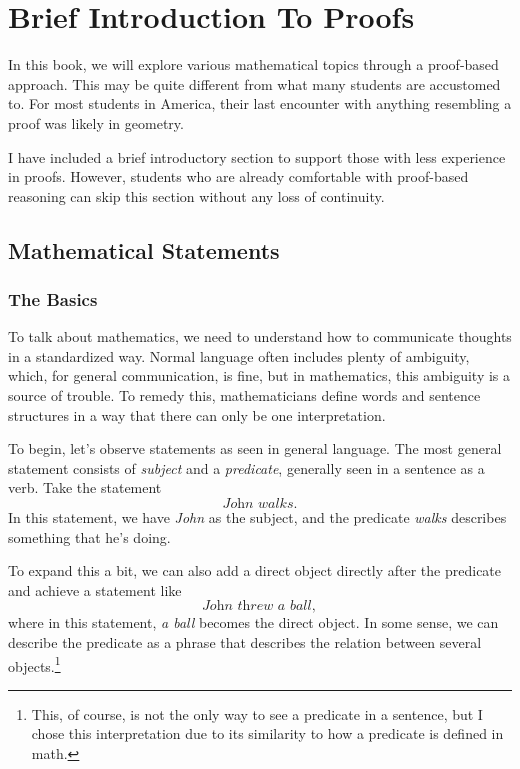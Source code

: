 \setcounter{chapter}{-1}

\edef\mychapter{Brief Introduction To Proofs}
\edef\mychapterdate{March 31, 2025}

\chapter{\mychapter}

In this book, we will explore various mathematical topics through a proof-based approach. This may be quite different from what many students are accustomed to. For most students in America, their last encounter with anything resembling a proof was likely in geometry.

I have included a brief introductory section to support those with less experience in proofs. However, students who are already comfortable with proof-based reasoning can skip this section without any loss of continuity.

\section{Mathematical Statements}
\subsection{The Basics}
To talk about mathematics, we need to understand how to communicate thoughts in a standardized way.
Normal language often includes plenty of ambiguity, which, for general communication, is fine, but in mathematics, this ambiguity is a source of trouble.
To remedy this, mathematicians define words and sentence structures in a way that there can only be one interpretation.

To begin, let's observe statements as seen in general language.
The most general statement consists of \textit{subject} and a \textit{predicate}, generally seen in a sentence as a verb.
Take the statement
$$\textit{John walks}.$$
In this statement, we have \textit{John} as the subject, and the predicate \textit{walks} describes something that he's doing.

To expand this a bit, we can also add a direct object directly after the predicate and achieve a statement like
$$\textit{John threw a ball},$$
where in this statement, \textit{a ball} becomes the direct object.
In some sense, we can describe the predicate as a phrase that describes the relation between several objects.\footnote{This, of course, is not the only way to see a predicate in a sentence, but I chose this interpretation due to its similarity to how a predicate is defined in math.}


